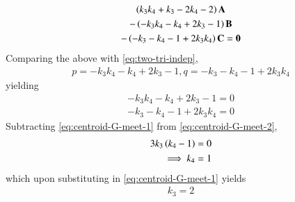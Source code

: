 \begin{enumerate}[label=\thesection.\arabic*.,ref=\thesection.\theenumi]
\begin{multline}
	  \left(k_3k_4+k_3-2k_4-2\right)\mathbf{A}
	  \\
	-  \left(-k_3k_4-k_4+2k_3-1\right)\mathbf{B}
	  \\
	  - \left(-k_3-k_4 - 1 
+2k_3k_4\right) \mathbf{C} = \mathbf{0}
  \end{multline}
  Comparing the above with 
	  \eqref{eq:two-tri-indep},
  \begin{align}
	  p = {-k_3k_4-k_4+2k_3-1}, q = {-k_3-k_4 - 1 
+2k_3k_4}
  \end{align}
  yielding 
  \begin{align}
	  \label{eq:centroid-G-meet-1}
	   {-k_3k_4-k_4+2k_3-1} = 0
	   \\ {-k_3-k_4 - 1 
+2k_3k_4} = 0
	  \label{eq:centroid-G-meet-2}
  \end{align}
  Subtracting 
	  \eqref{eq:centroid-G-meet-1}
	  from
	  \eqref{eq:centroid-G-meet-2},
  \begin{align}
	  3k_3\left(k_4-1\right) &= 0
	  \\
	  \implies k_4&=1
  \end{align}
  which upon substituting in 
	  \eqref{eq:centroid-G-meet-1}
	  yields
  \begin{align}
	  k_3 = 2
  \end{align}
	  \end{enumerate}
